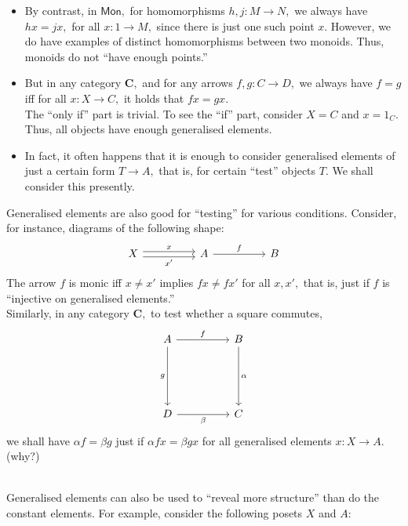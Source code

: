\begin{enumerate}
\begin{itemize}
	\item By contrast, in $\mathsf{Mon},$ for homomorphisms $h, j: M \to N,$ we always have $hx = jx,$ for all $x:1 \to M,$ since there is just one such point $x.$ However, we do have examples of distinct homomorphisms between two monoids. Thus, monoids do not ``have enough points.''
	\item But in any category $\mathbf{C},$ and for any arrows $f, g:C\to D,$ we always have $f = g$ iff for all $x:X\to C,$ it holds that $fx = gx.$\\
	The ``only if'' part is trivial. To see the ``if'' part, consider $X = C$ and $x = 1_C.$\\
	Thus, all objects have enough generalised elements.
	\item In fact, it often happens that it is enough to consider generalised elements of just a certain form $T \to A,$ that is, for certain ``test'' objects $T.$ We shall consider this presently.
\end{itemize}
Generalised elements are also good for ``testing'' for various conditions. Consider, for instance, diagrams of the following shape:
\begin{equation*} 
	\begin{tikzcd}
		X \arrow[rr, "x", shift left = 1] \arrow[rr, "x'"', shift right = 1] && A \arrow[rr, "f"] && B 
	\end{tikzcd}
\end{equation*}
The arrow $f$ is monic iff $x \neq x'$ implies $fx \neq fx'$ for all $x, x',$ that is, just if $f$ is ``injective on generalised elements.''\\
Similarly, in any category $\mathbf{C},$ to test whether a square commutes,
\begin{equation*} 
	\begin{tikzcd}
	A \arrow[rr, "f"] \arrow[ddd, "g"'] &  & B \arrow[ddd, "\alpha"] \\&&\\&&\\D \arrow[rr, "\beta"']&&C
	\end{tikzcd}
\end{equation*}	
we shall have $\alpha f = \beta g$ just if $\alpha fx = \beta gx$ for all generalised elements $x:X \to A.$ (why?)\\\\
\end{enumerate}
\example{} Generalised elements can also be used to ``reveal more structure'' than do the constant elements. For example, consider the following posets $X$ and $A:$
